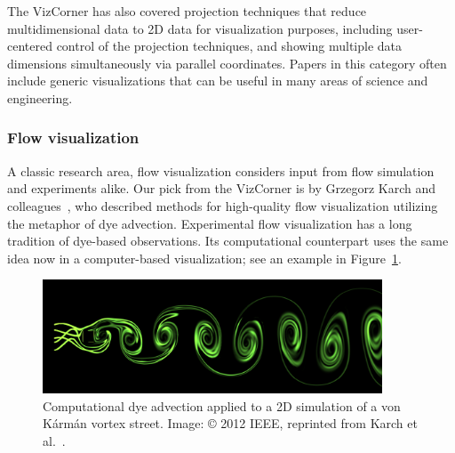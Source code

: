 \documentclass[10pt,journal,compsoc]{IEEEtran}
\begin{document}
The VizCorner has also covered projection techniques that reduce multidimensional data to 2D data for visualization purposes, including user-centered control of the projection techniques, and showing multiple data dimensions simultaneously via parallel coordinates. Papers in this category often include generic visualizations that can be useful in many areas of science and engineering.

\subsubsection*{Flow visualization}

A classic research area, flow visualization considers input from flow simulation and experiments alike. Our pick from the VizCorner is by Grzegorz Karch and colleagues~\cite{Karch2012}, who described methods for high-quality flow visualization utilizing the metaphor of dye advection. Experimental flow visualization has a long tradition of dye-based observations. Its computational counterpart uses the same idea now in a computer-based visualization; see an example in Figure~\ref{fig:karman}. 

\begin{figure}
	\begin{center}	
		\includegraphics[width=0.9\textwidth]{karman_weno3.png}
		\caption{Computational dye advection applied to a 2D simulation of a von K{\'a}rm{\'a}n vortex street. Image: \copyright{} 2012 IEEE, reprinted from Karch et al.~\cite{Karch2012}.
  \label{fig:karman}}		
	\end{center}
\end{figure}
\end{document}
